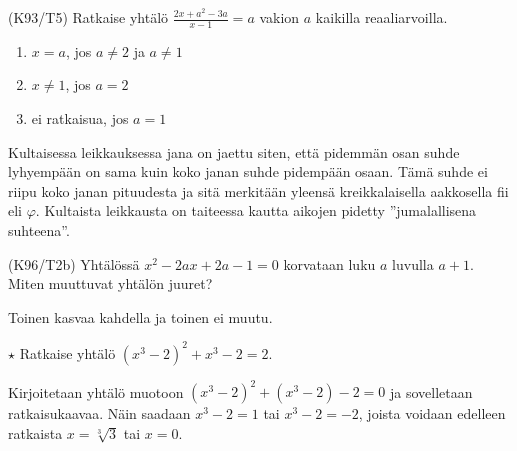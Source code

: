 \begin{tehtavasivu}
\begin{tehtava}
(K93/T5) Ratkaise yhtälö
        $\frac{2x+a^2-3a}{x-1}=a$ vakion $a$ kaikilla reaaliarvoilla.
\begin{vastaus}
        \begin{enumerate}
         \item{$x=a$, jos $a \neq 2$ ja $a \neq 1$}
         \item{$x\neq 1$, jos $a=2$}
         \item{ei ratkaisua, jos $a=1$}
        \end{enumerate}
    \end{vastaus}
\end{tehtava}

\begin{tehtava}
    Kultaisessa leikkauksessa jana on jaettu siten, että pidemmän osan suhde lyhyempään on sama kuin koko janan suhde pidempään osaan. Tämä suhde ei riipu koko janan pituudesta ja sitä merkitään yleensä kreikkalaisella aakkosella fii eli $\varphi$. Kultaista leikkausta on taiteessa kautta aikojen pidetty ''jumalallisena suhteena''.
		\begin{alakohdat}
        \end{alakohdat}
    \begin{vastaus}
        \begin{alakohdat}
        \end{alakohdat}
    \end{vastaus}
\end{tehtava}

\begin{tehtava}
(K96/T2b) Yhtälössä $x^2-2ax+2a-1=0$ korvataan luku $a$ luvulla $a+1$. Miten muuttuvat yhtälön juuret?
\begin{vastaus}
     Toinen kasvaa kahdella ja toinen ei muutu.
    \end{vastaus}
\end{tehtava}

\begin{tehtava}
	$\star$ Ratkaise yhtälö $(x^3-2)^2+x^3-2=2$.
	\begin{vastaus}
		Kirjoitetaan yhtälö muotoon $(x^3-2)^2+(x^3-2)-2=0$ ja sovelletaan ratkaisukaavaa.
		Näin saadaan $x^3-2=1$ tai $x^3-2=-2$, joista voidaan edelleen ratkaista $x=\sqrt[3]{3}$ tai $x=0$.
	\end{vastaus}
\end{tehtava}

\end{tehtavasivu}
